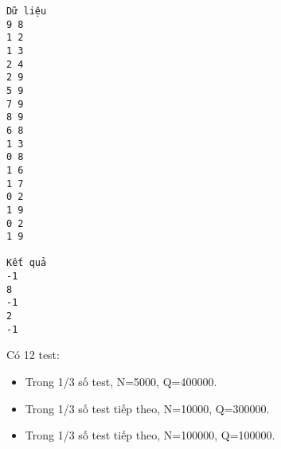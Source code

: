 \begin{verbatim}
Dữ liệu
9 8
1 2
1 3
2 4
2 9
5 9
7 9
8 9
6 8
1 3
0 8
1 6
1 7
0 2
1 9
0 2
1 9 

Kết quả
-1
8
-1
2
-1
\end{verbatim}
Có 12 test:
\begin{itemize}
	\item Trong 1/3 số test, N=5000, Q=400000.
	\item Trong 1/3 số test tiếp theo, N=10000, Q=300000.
	\item Trong 1/3 số test tiếp theo, N=100000, Q=100000.
\end{itemize}
